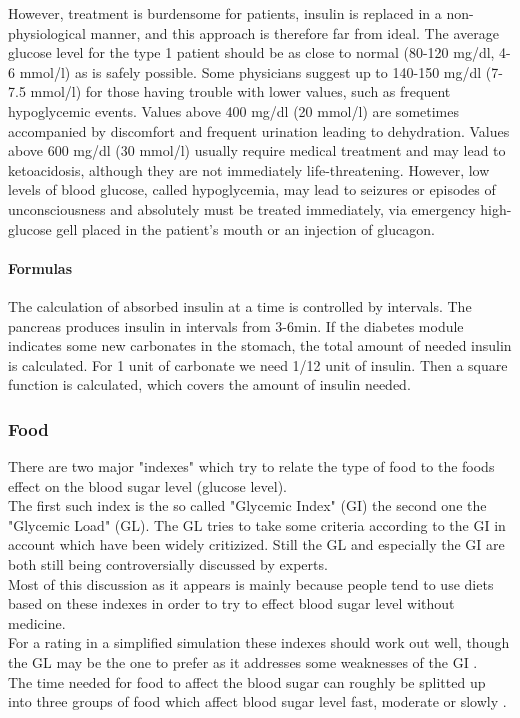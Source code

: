 \documentclass[pdflatex,a4paper,11pt,english]{scrreprt}
\begin{document}
However, treatment is burdensome for patients, insulin is replaced in a
non-physiological manner, and this approach is therefore far from ideal. The
average glucose level for the type 1 patient should be as close to normal
(80-120 mg/dl, 4-6 mmol/l) as is safely possible. Some physicians suggest up to
140-150 mg/dl (7-7.5 mmol/l) for those having trouble with lower values, such
as frequent hypoglycemic events. Values above 400 mg/dl (20 mmol/l) are
sometimes accompanied by discomfort and frequent urination leading to
dehydration. Values above 600 mg/dl (30 mmol/l) usually require medical
treatment and may lead to ketoacidosis, although they are not immediately
life-threatening. However, low levels of blood glucose, called hypoglycemia,
may lead to seizures or episodes of unconsciousness and absolutely must be
treated immediately, via emergency high-glucose gell placed in the patient's
mouth or an injection of glucagon.

\paragraph{Formulas} 
The calculation of absorbed insulin at a time is controlled by intervals. The pancreas produces insulin in intervals from 3-6min.
If the diabetes module indicates some new carbonates in the stomach, the total amount of needed insulin is calculated.
For 1 unit of carbonate we need 1/12 unit of insulin. Then a square function is calculated, which covers the amount of insulin needed.

\newpage
\subsubsection{Food}
There are two major "indexes" which try to relate the type of food to the foods effect on the blood sugar level (glucose level). \\
The first such index is the so called "Glycemic Index" (GI) the second one the "Glycemic Load" (GL).
The GL tries to take some criteria according to the GI in account which have been widely critizized. Still the GL and especially the GI are both still being controversially discussed by experts. \\
Most of this discussion as it appears is mainly because people tend to use
diets based on these indexes in order to try to effect blood sugar level
without medicine. \\
For a rating in a simplified simulation these indexes should
work out well, though the GL may be the one to prefer as it addresses some
weaknesses of the GI \cite{norden:glycemicindex}. \\
The time needed for food to affect the blood sugar can roughly be splitted up
into three groups of food which affect blood sugar level fast, moderate or
slowly \cite{mit:glycemicindex}.
\end{document}
